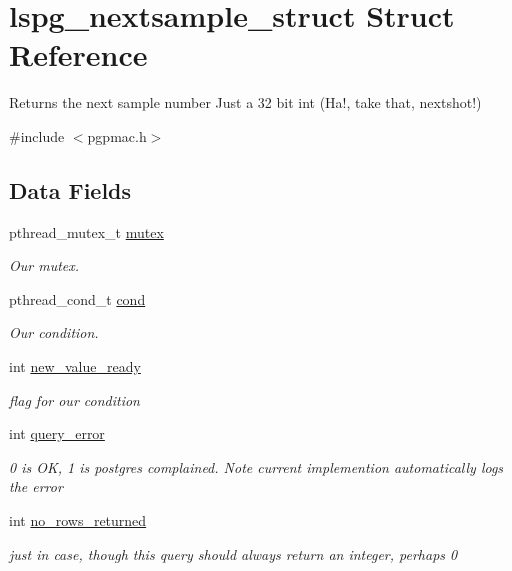 \hypertarget{structlspg__nextsample__struct}{\section{lspg\-\_\-nextsample\-\_\-struct Struct Reference}
\label{structlspg__nextsample__struct}
}


Returns the next sample number Just a 32 bit int (Ha!, take that, nextshot!)  




{\ttfamily \#include $<$pgpmac.\-h$>$}

\subsection*{Data Fields}
\begin{DoxyCompactItemize}
\item 
pthread\-\_\-mutex\-\_\-t \hyperlink{structlspg__nextsample__struct_a99408b5825e2510f07be199d2cdc3633}{mutex}
\begin{DoxyCompactList}\small\item\em Our mutex. \end{DoxyCompactList}\item 
pthread\-\_\-cond\-\_\-t \hyperlink{structlspg__nextsample__struct_a5b46e4537dac3be839f6c3eeff6b46b6}{cond}
\begin{DoxyCompactList}\small\item\em Our condition. \end{DoxyCompactList}\item 
int \hyperlink{structlspg__nextsample__struct_ab1c9e9d3dc5140137a7ccf908e95f69e}{new\-\_\-value\-\_\-ready}
\begin{DoxyCompactList}\small\item\em flag for our condition \end{DoxyCompactList}\item 
int \hyperlink{structlspg__nextsample__struct_ade2772532d53709c5144d07332966a4a}{query\-\_\-error}
\begin{DoxyCompactList}\small\item\em 0 is O\-K, 1 is postgres complained. Note current implemention automatically logs the error \end{DoxyCompactList}\item 
int \hyperlink{structlspg__nextsample__struct_aeee8110133db9f1895237ed9b54dd873}{no\-\_\-rows\-\_\-returned}
\begin{DoxyCompactList}\small\item\em just in case, though this query should always return an integer, perhaps 0 \end{DoxyCompactList}\item 

\end{DoxyCompactItemize}
